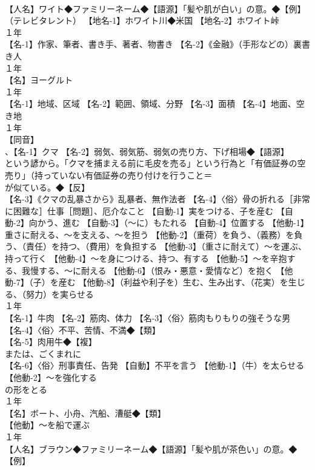 \documentclass[8pt]{extreport}
\begin{document}
\begin{CJK}{UTF8}{min}
\\	【人名】ワイト◆ファミリーネーム◆【語源】「髪や肌が白い」の意。◆【例】
\\	（テレビタレント） 【地名-1】ホワイト川◆米国 【地名-2】ホワイト峠
\\	１年	
\\	【名-1】作家、筆者、書き手、著者、物書き 【名-2】《金融》（手形などの）裏書き人
\\	１年	
\\	【名】ヨーグルト
\\	１年	
\\	【名-1】地域、区域 【名-2】範囲、領域、分野 【名-3】面積 【名-4】地面、空き地
\\	１年	
\\	【同音】
\\	、【名-1】クマ 【名-2】弱気、弱気筋、弱気の売り方、下げ相場◆【語源】
\\	という諺から。「クマを捕まえる前に毛皮を売る」という行為と「有価証券の空売り」（持っていない有価証券の売り付けを行うこと＝
\\	が似ている。◆【反】
\\	【名-3】《クマの乱暴さから》乱暴者、無作法者 【名-4】〈俗〉骨の折れる［非常に困難な］仕事［問題］、厄介なこと 【自動-1】実をつける、子を産む 【自動-2】向かう、進む 【自動-3】（～に）もたれる 【自動-4】位置する 【他動-1】重さに耐える、～を支える、～を担う 【他動-2】（重荷）を負う、（義務）を負う、（責任）を持つ、（費用）を負担する 【他動-3】（重さに耐えて）～を運ぶ、持って行く 【他動-4】～を身につける、持つ、有する 【他動-5】～を辛抱する、我慢する、～に耐える 【他動-6】（恨み・悪意・愛情など）を抱く 【他動-7】（子）を産む 【他動-8】（利益や利子を）生む、生み出す、（花実）を生じる、（努力）を実らせる
\\	１年	
\\	【名-1】牛肉 【名-2】筋肉、体力 【名-3】〈俗〉筋肉もりもりの強そうな男 【名-4】〈俗〉不平、苦情、不満◆【類】
\\	【名-5】肉用牛◆【複】
\\	または、ごくまれに 
\\	【名-6】〈俗〉刑事責任、告発 【自動】不平を言う 【他動-1】（牛）を太らせる 【他動-2】～を強化する
\\	の形をとる
\\	１年	
\\	【名】ボート、小舟、汽船、漕艇◆【類】
\\	【他動】～を船で運ぶ
\\	１年	
\\	【人名】ブラウン◆ファミリーネーム◆【語源】「髪や肌が茶色い」の意。◆【例】

\end{CJK}
\end{document}
